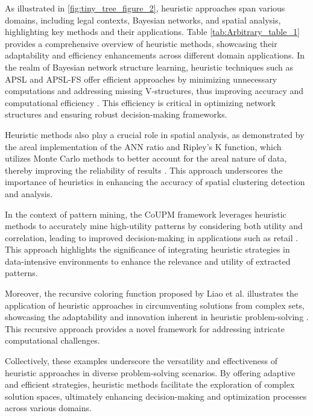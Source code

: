 As illustrated in \autoref{fig:tiny_tree_figure_2}, heuristic approaches span various domains, including legal contexts, Bayesian networks, and spatial analysis, highlighting key methods and their applications. Table \ref{tab:Arbitrary_table_1} provides a comprehensive overview of heuristic methods, showcasing their adaptability and efficiency enhancements across different domain applications. In the realm of Bayesian network structure learning, heuristic techniques such as APSL and APSL-FS offer efficient approaches by minimizing unnecessary computations and addressing missing V-structures, thus improving accuracy and computational efficiency \cite{ling2021bayesiannetworkstructurelearning}. This efficiency is critical in optimizing network structures and ensuring robust decision-making frameworks.

Heuristic methods also play a crucial role in spatial analysis, as demonstrated by the areal implementation of the ANN ratio and Ripley’s K function, which utilizes Monte Carlo methods to better account for the areal nature of data, thereby improving the reliability of results \cite{vidanapathirana2022clusterdetectioncapabilitiesaverage}. This approach underscores the importance of heuristics in enhancing the accuracy of spatial clustering detection and analysis.

In the context of pattern mining, the CoUPM framework leverages heuristic methods to accurately mine high-utility patterns by considering both utility and correlation, leading to improved decision-making in applications such as retail \cite{gan2019correlatedutilitybasedpatternmining}. This approach highlights the significance of integrating heuristic strategies in data-intensive environments to enhance the relevance and utility of extracted patterns.

Moreover, the recursive coloring function proposed by Liao et al. illustrates the application of heuristic approaches in circumventing solutions from complex sets, showcasing the adaptability and innovation inherent in heuristic problem-solving \cite{liao2023recursivecoloringfunctionpi30}. This recursive approach provides a novel framework for addressing intricate computational challenges.

Collectively, these examples underscore the versatility and effectiveness of heuristic approaches in diverse problem-solving scenarios. By offering adaptive and efficient strategies, heuristic methods facilitate the exploration of complex solution spaces, ultimately enhancing decision-making and optimization processes across various domains.

